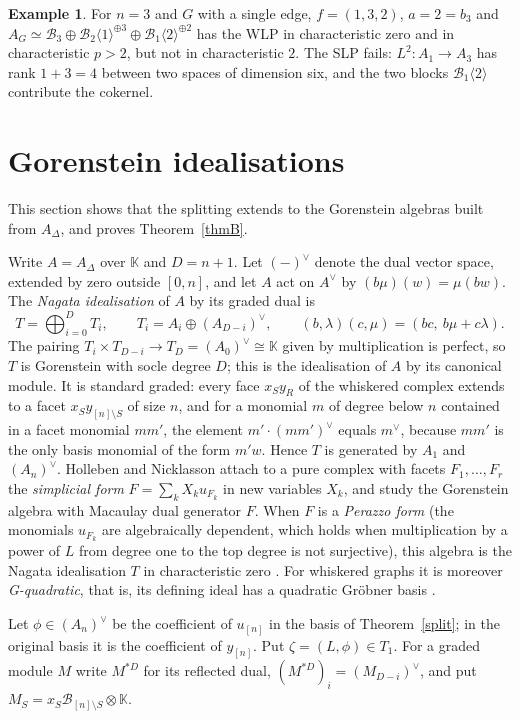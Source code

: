 \documentclass[11pt,a4paper]{article}
\theoremstyle{definition}
\newtheorem{example}[theorem]{Example}
\newcommand{\kk}{\mathbb K}
\newcommand{\B}{\mathcal B}
\newcommand{\dual}{^{\vee}}
\begin{document}
\begin{example}
For $n=3$ and $G$ with a single edge, $f=(1,3,2)$, $a=2=b_3$ and $A_G\simeq\B_3\oplus\B_2\langle1\rangle^{\oplus3}\oplus\B_1\langle2\rangle^{\oplus2}$ has the WLP in characteristic zero and in characteristic $p>2$, but not in characteristic $2$. The SLP fails: $L^2:A_1\to A_3$ has rank $1+3=4$ between two spaces of dimension six, and the two blocks $\B_1\langle2\rangle$ contribute the cokernel.
\end{example}

\section{Gorenstein idealisations}\label{sec:gor}

This section shows that the splitting extends to the Gorenstein algebras built from $A_\Delta$, and proves Theorem~\ref{thmB}.

Write $A=A_\Delta$ over $\kk$ and $D=n+1$. Let $(-)\dual$ denote the dual vector space, extended by zero outside $[0,n]$, and let $A$ act on $A\dual$ by $(b\mu)(w)=\mu(bw)$. The \emph{Nagata idealisation} of $A$ by its graded dual is
\[
 T=\bigoplus_{i=0}^{D}T_i,\qquad T_i=A_i\oplus(A_{D-i})\dual,\qquad (b,\lambda)(c,\mu)=(bc,\ b\mu+c\lambda).
\]
The pairing $T_i\times T_{D-i}\to T_D=(A_0)\dual\cong\kk$ given by multiplication is perfect, so $T$ is Gorenstein with socle degree $D$; this is the idealisation of $A$ by its canonical module. It is standard graded: every face $x_Sy_R$ of the whiskered complex extends to a facet $x_Sy_{[n]\setminus S}$ of size $n$, and for a monomial $m$ of degree below $n$ contained in a facet monomial $mm'$, the element $m'\cdot(mm')\dual$ equals $m\dual$, because $mm'$ is the only basis monomial of the form $m'w$. Hence $T$ is generated by $A_1$ and $(A_n)\dual$. Holleben and Nicklasson attach to a pure complex with facets $F_1,\dots,F_r$ the \emph{simplicial form} $F=\sum_kX_ku_{F_k}$ in new variables $X_k$, and study the Gorenstein algebra with Macaulay dual generator $F$. When $F$ is a \emph{Perazzo form} (the monomials $u_{F_k}$ are algebraically dependent, which holds when multiplication by a power of $L$ from degree one to the top degree is not surjective), this algebra is the Nagata idealisation $T$ in characteristic zero \cite[Lemmas~4.3 and~4.5]{HN}. For whiskered graphs it is moreover \emph{G-quadratic}, that is, its defining ideal has a quadratic Gr\"obner basis \cite[Theorem~4.4]{HN}.

Let $\phi\in(A_n)\dual$ be the coefficient of $u_{[n]}$ in the basis of Theorem~\ref{split}; in the original basis it is the coefficient of $y_{[n]}$. Put $\zeta=(L,\phi)\in T_1$. For a graded module $M$ write $M^{*D}$ for its reflected dual, $(M^{*D})_i=(M_{D-i})\dual$, and put $M_S=x_S\B_{[n]\setminus S}\otimes\kk$.
\end{document}

